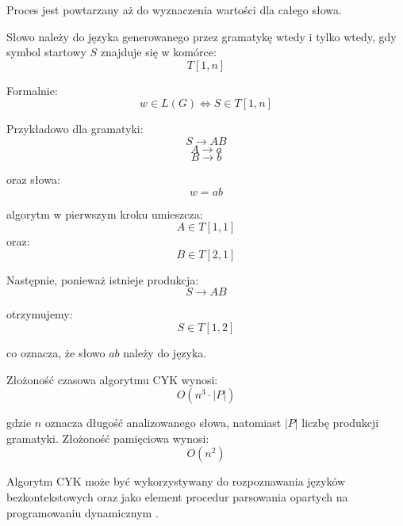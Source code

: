 \documentclass[12pt]{article}
\begin{document}
Proces jest powtarzany aż do wyznaczenia wartości dla całego słowa.

Słowo należy do języka generowanego przez gramatykę wtedy i tylko wtedy, gdy symbol startowy $S$ znajduje się w komórce:
\begin{equation}
T[1,n]
\end{equation}

Formalnie:
\begin{equation}
w \in L(G) \iff S \in T[1,n]
\end{equation}

Przykładowo dla gramatyki:
\begin{equation}
S \rightarrow AB
\end{equation}
\begin{equation}
A \rightarrow a
\end{equation}
\begin{equation}
B \rightarrow b
\end{equation}

oraz słowa:
\begin{equation}
w = ab
\end{equation}

algorytm w pierwszym kroku umieszcza:
\begin{equation}
A \in T[1,1]
\end{equation}
oraz:
\begin{equation}
B \in T[2,1]
\end{equation}

Następnie, ponieważ istnieje produkcja:
\begin{equation}
S \rightarrow AB
\end{equation}

otrzymujemy:
\begin{equation}
S \in T[1,2]
\end{equation}

co oznacza, że słowo $ab$ należy do języka.

Złożoność czasowa algorytmu CYK wynosi:
\begin{equation}
O(n^3 \cdot |P|)
\end{equation}

gdzie $n$ oznacza długość analizowanego słowa, natomiast $|P|$ liczbę produkcji gramatyki. Złożoność pamięciowa wynosi:
\begin{equation}
O(n^2)
\end{equation}

Algorytm CYK może być wykorzystywany do rozpoznawania języków bezkontekstowych oraz jako element procedur parsowania opartych na programowaniu dynamicznym \cite{younger1967,kasami1965}.
\end{document}
